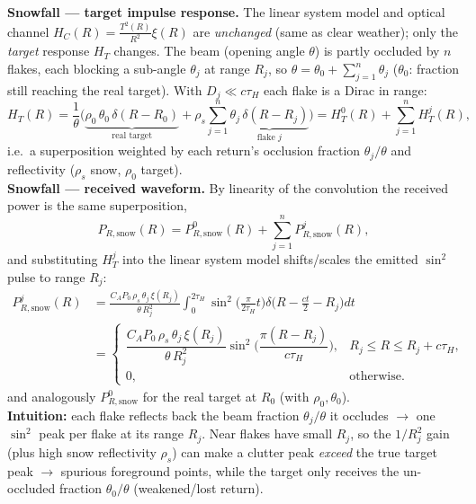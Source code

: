 \documentclass{article}
\begin{document}
\textbf{Snowfall --- target impulse response.} The linear system model and optical channel $H_C(R)=\frac{T^2(R)}{R^2}\xi(R)$ are \textit{unchanged} (same as clear weather); only the \textit{target} response $H_T$ changes. The beam (opening angle $\theta$) is partly occluded by $n$ flakes, each blocking a sub-angle $\theta_j$ at range $R_j$, so $\theta=\theta_0+\sum_{j=1}^n\theta_j$ ($\theta_0$: fraction still reaching the real target). With $D_j\ll c\tau_H$ each flake is a Dirac in range:
\begin{equation*}
H_T(R)=\frac{1}{\theta}\Big(\underbrace{\rho_0\,\theta_0\,\delta(R-R_0)}_{\text{real target}}+\rho_s\sum_{j=1}^n\underbrace{\theta_j\,\delta(R-R_j)}_{\text{flake }j}\Big)=H_T^0(R)+\sum_{j=1}^n H_T^j(R),
\end{equation*}
i.e.\ a superposition weighted by each return's occlusion fraction $\theta_j/\theta$ and reflectivity ($\rho_s$ snow, $\rho_0$ target).\\

\textbf{Snowfall --- received waveform.} By linearity of the convolution the received power is the same superposition,
\begin{equation*}
P_{R,\text{snow}}(R)=P_{R,\text{snow}}^0(R)+\sum_{j=1}^n P_{R,\text{snow}}^j(R),
\end{equation*}
and substituting $H_T^j$ into the linear system model shifts/scales the emitted $\sin^2$ pulse to range $R_j$:
\begin{equation*}
\begin{aligned}
P_{R,\text{snow}}^j(R)&=\frac{C_A P_0\,\rho_s\,\theta_j\,\xi(R_j)}{\theta\,R_j^2}\int_0^{2\tau_H}\!\sin^2\!\Big(\tfrac{\pi}{2\tau_H}t\Big)\delta\!\Big(R-\tfrac{ct}{2}-R_j\Big)dt\\[1mm]
&=\begin{cases}\dfrac{C_A P_0\,\rho_s\,\theta_j\,\xi(R_j)}{\theta\,R_j^2}\sin^2\!\Big(\dfrac{\pi(R-R_j)}{c\tau_H}\Big), & R_j\le R\le R_j+c\tau_H,\\[2mm] 0,&\text{otherwise.}\end{cases}
\end{aligned}
\end{equation*}
and analogously $P_{R,\text{snow}}^0$ for the real target at $R_0$ (with $\rho_0,\theta_0$).\\

\textbf{Intuition:} each flake reflects back the beam fraction $\theta_j/\theta$ it occludes $\rightarrow$ one $\sin^2$ peak per flake at its range $R_j$. Near flakes have small $R_j$, so the $1/R_j^2$ gain (plus high snow reflectivity $\rho_s$) can make a clutter peak \textit{exceed} the true target peak $\rightarrow$ spurious foreground points, while the target only receives the un-occluded fraction $\theta_0/\theta$ (weakened/lost return).
\end{document}

